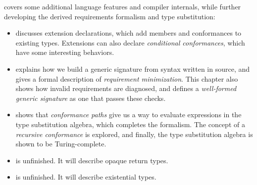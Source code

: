 \documentclass[../generics]{subfiles}
\begin{document}
 covers some additional language features and compiler internals, while further developing the derived requirements formalism and type substitution:
\begin{itemize}
\item {} discusses extension declarations, which add members and conformances to existing types. Extensions can also declare \emph{conditional conformances}, which have some interesting behaviors.

\item {} explains how we build a generic signature from syntax written in source, and gives a formal description of \emph{requirement minimization}. This chapter also shows how invalid requirements are diagnosed, and defines a \emph{well-formed generic signature} as one that passes these checks.

\item {} shows that \emph{conformance paths} give us a way to evaluate expressions in the type substitution algebra, which completes the formalism. The concept of a \emph{recursive conformance} is explored, and finally, the type substitution algebra is shown to be Turing-complete.

\item {} is unfinished. It will describe opaque return types.

\item {} is unfinished. It will describe existential types.
\end{itemize}
\end{document}
